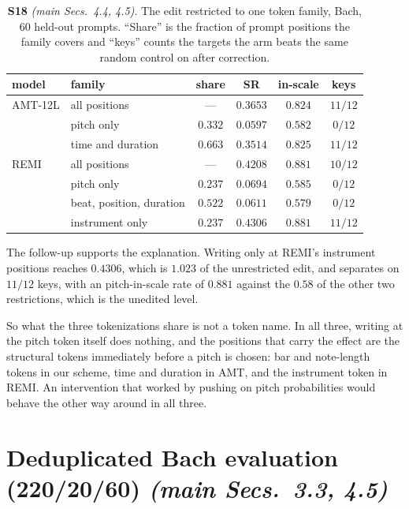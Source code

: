 \documentclass{article}
\begin{document}
\begin{table}[!t]
\centering
\caption{\textbf{S18} \textit{(main Secs.~4.4, 4.5)}. The edit restricted to one token
family, Bach, $60$ held-out prompts. ``Share'' is the fraction of prompt positions the
family covers and ``keys'' counts the targets the arm beats the same random control on
after correction.}
\label{tab:supp-public-positions}
\footnotesize
\setlength{\tabcolsep}{4pt}
\begin{tabular}{@{}llcccc@{}}
\toprule
model & family & share & SR & in-scale & keys\\
\midrule
AMT-12L & all positions        & ---     & $0.3653$ & $0.824$ & $11/12$\\
        & pitch only           & $0.332$ & $0.0597$ & $0.582$ & $0/12$\\
        & time and duration    & $0.663$ & $0.3514$ & $0.825$ & $11/12$\\
\midrule
REMI    & all positions        & ---     & $0.4208$ & $0.881$ & $10/12$\\
        & pitch only           & $0.237$ & $0.0694$ & $0.585$ & $0/12$\\
        & beat, position, duration & $0.522$ & $0.0611$ & $0.579$ & $0/12$\\
        & instrument only      & $0.237$ & $0.4306$ & $0.881$ & $11/12$\\
\bottomrule
\end{tabular}
\end{table}

The follow-up supports the explanation. Writing only at REMI's instrument positions
reaches $0.4306$, which is $1.023$ of the unrestricted edit, and separates on $11/12$
keys, with an pitch-in-scale rate of $0.881$ against the $0.58$ of the other two
restrictions, which is the unedited level.

So what the three tokenizations share is not a token name. In all three, writing at the
pitch token itself does nothing, and the positions that carry the effect are the
structural tokens immediately before a pitch is chosen: bar and note-length tokens in
our scheme, time and duration in AMT, and the instrument token in REMI. An intervention that
worked by pushing on pitch probabilities would behave the other way around in all three.

\section{Deduplicated Bach evaluation (220/20/60) \normalfont\textit{(main Secs.~3.3, 4.5)}}
\label{sec:dedup}
\end{document}
